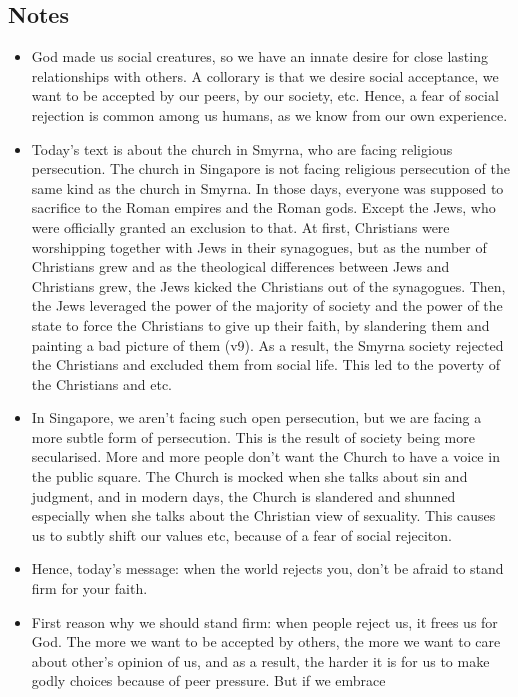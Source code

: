 \subsection*{Notes}
\begin{itemize}
  \item{God made us social creatures, so we have an innate desire for close
  lasting relationships with others.  A collorary is that we desire social
  acceptance, we want to be accepted by our peers, by our society, etc.
  Hence, a fear of social rejection is common among us humans, as we know
  from our own experience.}
  \item{Today's text is about the church in Smyrna, who are facing religious
  persecution.  The church in Singapore is not facing religious persecution
  of the same kind as the church in Smyrna.  In those days, everyone was
  supposed to sacrifice to the Roman empires and the Roman gods.  Except the
  Jews, who were officially granted an exclusion to that.  At first,
  Christians were worshipping together with Jews in their synagogues, but as
  the number of Christians grew and as the theological differences between
  Jews and Christians grew, the Jews kicked the Christians out of the
  synagogues.  Then, the Jews leveraged the power of the majority of society
  and the power of the state to force the Christians to give up their faith,
  by slandering them and painting a bad picture of them (v9).  As a result,
  the Smyrna society rejected the Christians and excluded them from social
  life.  This led to the poverty of the Christians and etc.}
  \item{In Singapore, we aren't facing such open persecution, but we are
  facing a more subtle form of persecution.  This is the result of society
  being more secularised.  More and more people don't want the Church to have
  a voice in the public square.  The Church is mocked when she talks about
  sin and judgment, and in modern days, the Church is slandered and shunned
  especially when she talks about the Christian view of sexuality.  This
  causes us to subtly shift our values etc, because of a fear of social
  rejeciton.}
  \item{Hence, today's message: when the world rejects you, don't be afraid
  to stand firm for your faith. }
  \item{First reason why we should stand firm: when people reject us, it
  frees us for God.  The more we want to be accepted by others, the more we
  want to care about other's opinion of us, and as a result, the harder it is
  for us to make godly choices because of peer pressure.  But if we embrace
}
\end{itemize}
